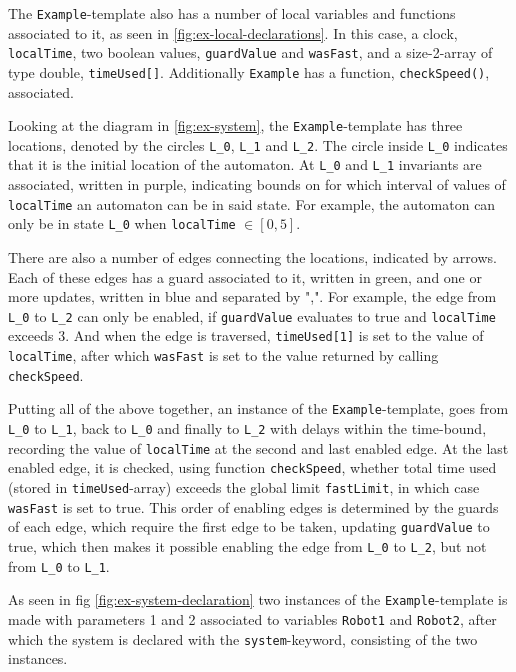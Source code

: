 The \verb|Example|-template also has a number of local variables and functions associated to it, as seen in \ref{fig:ex-local-declarations}. In this case, a clock, \verb|localTime|, two boolean values, \verb|guardValue| and \verb|wasFast|, and a size-2-array of type double, \verb|timeUsed[]|. Additionally \verb|Example| has a function, \verb|checkSpeed()|, associated.

Looking at the diagram in \ref{fig:ex-system}, the \verb|Example|-template has three locations, denoted by the circles \verb|L_0|, \verb|L_1| and \verb|L_2|. The circle inside \verb|L_0| indicates that it is the initial location of the automaton. At \verb|L_0| and \verb|L_1| invariants are associated, written in purple, indicating bounds on for which interval of values of \verb|localTime| an automaton can be in said state. For example, the automaton can only be in state \verb|L_0| when \verb|localTime| $\in [0,5]$.

There are also a number of edges connecting the locations, indicated by arrows. Each of these edges has a guard associated to it, written in green, and one or more updates, written in blue and separated by ",". For example, the edge from \verb|L_0| to \verb|L_2|
can only be enabled, if \verb|guardValue| evaluates to true and \verb|localTime| exceeds 3. And when the edge is traversed, \verb|timeUsed[1]| is set to the value of \verb|localTime|, after which \verb|wasFast| is set to the value returned by calling \verb|checkSpeed|.
 
Putting all of the above together, an instance of the \verb|Example|-template, goes from \verb|L_0| to \verb|L_1|, back to \verb|L_0| and finally to \verb|L_2| with delays within the time-bound, recording the value of \verb|localTime| at the second and last enabled edge. At the last enabled edge, it is checked, using function \verb|checkSpeed|, whether total time used (stored in \verb|timeUsed|-array) exceeds the global limit \verb|fastLimit|, in which case \verb|wasFast| is set to true. This order of enabling edges is determined by the guards of each edge, which require the first edge to be taken, updating \verb|guardValue| to true, which then makes it possible enabling the edge from \verb|L_0| to \verb|L_2|, but not from \verb|L_0| to \verb|L_1|.

As seen in fig \ref{fig:ex-system-declaration} two instances of the \verb|Example|-template is made with parameters 1 and 2 associated to variables \verb|Robot1| and \verb|Robot2|, after which the system is declared with the \verb|system|-keyword, consisting of the two instances. 

